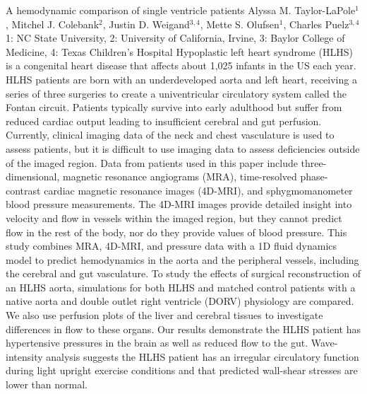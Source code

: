 \begin{addmargin}[2em]{0em}
\vspace{1.5ex}
\abs
{A hemodynamic comparison of single ventricle patients}
{Alyssa M. Taylor-LaPole$^{1}$, Mitchel J. Colebank$^{2}$, Justin D. Weigand$^{3,4}$, Mette S. Olufsen$^{1}$, Charles Puelz$^{3,4}$}
{1: NC State University, 2: University of California, Irvine, 3: Baylor College of Medicine, 4: Texas Children’s Hospital }
{Hypoplastic left heart syndrome (HLHS) is a congenital heart disease that affects about 1,025 infants in the US each year. HLHS patients are born with an underdeveloped aorta and left heart, receiving a series of three surgeries to create a univentricular circulatory system called the Fontan circuit. Patients typically survive into early adulthood but suffer from reduced cardiac output leading to insufficient cerebral and gut perfusion. Currently, clinical imaging data of the neck and chest vasculature is used to assess patients, but it is difficult to use imaging data to assess deficiencies outside of the imaged region. Data from patients used in this paper include three-dimensional, magnetic resonance angiograms (MRA), time-resolved phase-contrast cardiac magnetic resonance images (4D-MRI), and sphygmomanometer blood pressure measurements. The 4D-MRI images provide detailed insight into velocity and flow in vessels within the imaged region, but they cannot predict flow in the rest of the body, nor do they provide values of blood pressure. This study combines MRA, 4D-MRI, and pressure data with a 1D fluid dynamics model to predict hemodynamics in the aorta and the peripheral vessels, including the cerebral and gut vasculature. To study the effects of surgical reconstruction of an HLHS aorta, simulations for both HLHS and matched control patients with a native aorta and double outlet right ventricle (DORV) physiology are compared. We also use perfusion plots of the liver and cerebral tissues to investigate differences in flow to these organs. Our results demonstrate the HLHS patient has hypertensive pressures in the brain as well as reduced flow to the gut. Wave-intensity analysis suggests the HLHS patient has an irregular circulatory function during light upright exercise conditions and that predicted wall-shear stresses are lower than normal.}



\end{addmargin}
